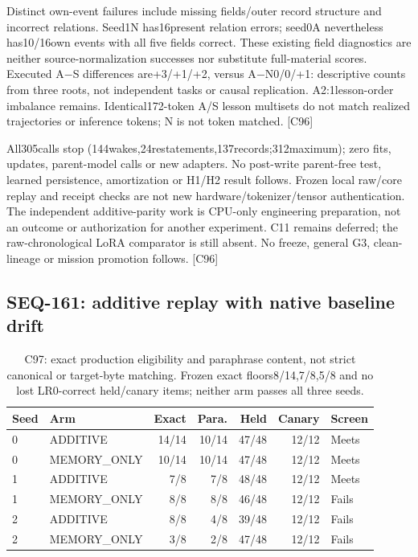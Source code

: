 \documentclass{article}
\begin{document}
Distinct own-event failures include missing fields/outer record structure and
incorrect relations. Seed1N has16present relation errors; seed0A nevertheless
has10/16own events with all five fields correct. These existing field diagnostics
are neither source-normalization successes nor substitute full-material scores.
Executed A$-$S differences are+3/+1/+2, versus A$-$N0/0/+1: descriptive counts
from three roots, not independent tasks or causal replication. A2:1lesson-order
imbalance remains. Identical172-token A/S lesson multisets do not match realized
trajectories or inference tokens; N is not token matched. [C96]

All305calls stop (144wakes,24restatements,137records;312maximum); zero fits,
updates, parent-model calls or new adapters. No post-write parent-free test, learned
persistence, amortization or H1/H2 result follows. Frozen local raw/core replay
and receipt checks are not new hardware/tokenizer/tensor authentication.
The independent additive-parity work is CPU-only engineering preparation, not
an outcome or authorization for another experiment. C11 remains deferred;
the raw-chronological LoRA comparator is still absent. No freeze, general G3,
clean-lineage or mission promotion follows. [C96]

\subsection{SEQ-161: additive replay with native baseline drift}
\label{sec:seq161-additive}
\begin{table}[t]
\centering
\small
\begin{tabular}{llrrrrl}
\toprule
Seed & Arm & Exact & Para. & Held & Canary & Screen \\
\midrule
0 & ADDITIVE & 14/14 & 10/14 & 47/48 & 12/12 & Meets \\
0 & MEMORY\_ONLY & 10/14 & 10/14 & 47/48 & 12/12 & Meets \\
1 & ADDITIVE & 7/8 & 7/8 & 48/48 & 12/12 & Meets \\
1 & MEMORY\_ONLY & 8/8 & 8/8 & 46/48 & 12/12 & Fails \\
2 & ADDITIVE & 8/8 & 4/8 & 39/48 & 12/12 & Fails \\
2 & MEMORY\_ONLY & 3/8 & 2/8 & 47/48 & 12/12 & Fails \\
\bottomrule
\end{tabular}
\caption{C97: exact production eligibility and paraphrase content, not strict
canonical or target-byte matching. Frozen exact floors8/14,7/8,5/8 and no lost
LR0-correct held/canary items; neither arm passes all three seeds.}
\label{tab:seq161-additive}
\end{table}
\end{document}
